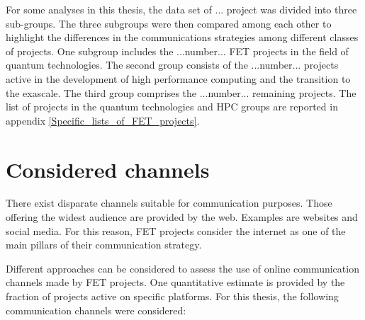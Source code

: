 For some analyses in this thesis, the data set of ... project was divided into three sub-groups. The three subgroups were then compared among each other to highlight the differences in the communications strategies among different classes of projects. One subgroup includes the ...number... FET projects in the field of quantum technologies. The second group consists of the ...number... projects active in the development of high performance computing and the transition to the exascale. The third group comprises the ...number... remaining projects. The list of projects in the quantum technologies and HPC groups are reported in appendix \ref{Specific_lists_of_FET_projects}.     

\section{Considered channels} 
There exist disparate channels suitable for communication purposes. Those offering the widest audience are provided by the web. Examples are websites and social media. For this reason, FET projects consider the internet as one of the main pillars of their communication strategy.

Different approaches can be considered to assess the use of online communication channels made by FET projects. One quantitative estimate is provided by the fraction of projects active on specific platforms. For this thesis, the following communication channels were considered:   

